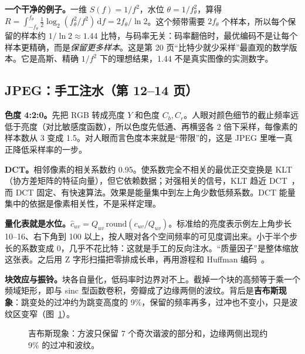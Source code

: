 \textbf{一个干净的例子。}一维 $S(f)=1/f^2$，水位 $\theta=1/f_\theta^2$，算得 $R=\int_{-f_\theta}^{f_\theta}\tfrac12\log_2(f_\theta^2/f^2)\,\mathrm df=2f_\theta/\ln2$。这个频带需要 $2f_\theta$ 个样本，所以每个保留的样本约 $1/\ln2\approx1.44$ 比特，与码率无关：码率翻倍时，最优编码不是让每个样本更精确，而是\emph{保留更多样本}。这是第 20 页“比特少就少采样”最直观的数学版本。它是高斯、精确 $1/f^2$ 下的理想结果，1.44 不是真实图像的实测数字。

\subsection{JPEG：手工注水（第 12--14 页）}\label{sec:jpeg}
\textbf{色度 4:2:0。}先把 RGB 转成亮度 $Y$ 和色度 $C_b,C_r$。人眼对颜色细节的截止频率远低于亮度（对比敏感度函数），所以色度先低通、再横竖各 2 倍下采样，每像素的样本数从 3 变成 1.5。对人眼而言色度本来就是“带限”的，这是 JPEG 里唯一真正降低采样率的一步。

\textbf{DCT。}相邻像素的相关系数约 0.95。使系数完全不相关的最优正交变换是 KLT（协方差矩阵的特征向量），但它依赖数据；对强相关的信号，KLT 趋近 DCT~\cite{ahmed1974}，而 DCT 固定、有快速算法。效果是能量集中到左上角少数低频系数。DCT 能量集中的依据是像素相关性，不是采样定理。

\textbf{量化表就是水位。}$\hat c_{uv}=Q_{uv}\,\mathrm{round}(c_{uv}/Q_{uv})$。标准给的亮度表示例左上角步长 10--16、右下角到 100 以上，按人眼对各个空间频率的可见度调出来。小于半个步长的系数变成 0，几乎不花比特：这就是手工的反向注水。“质量因子”是整体缩放这张表。之后用 Z 字形扫描把零排成长串，再用游程和 Huffman 编码~\cite{wallace1992}。

\textbf{块效应与振铃。}块各自量化，低码率时边界对不上。截掉一个块的高频等于乘一个频域矩形，即与 sinc 型函数卷积，旁瓣成了边缘两侧的波纹。背后是\textbf{吉布斯现象}：跳变处的过冲约为跳变高度的 9\%，保留的频率再多，过冲也不变小，只是波纹区变窄（图~\ref{fig:gibbs}）。

\begin{figure}[htbp]
\centering
{}
\caption{吉布斯现象：方波只保留 7 个奇次谐波的部分和，边缘两侧出现约 9\% 的过冲和波纹。}\label{fig:gibbs}
\end{figure}

